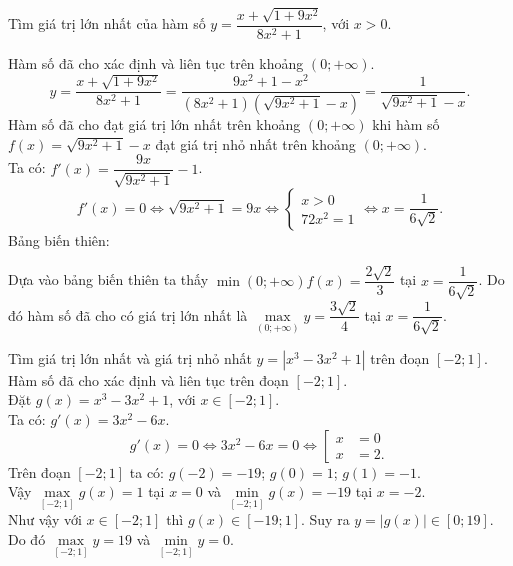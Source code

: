 \begin{bt}%
	Tìm giá trị lớn nhất của hàm số $y = \dfrac{x + \sqrt{1 + 9x^2}}{8x^2 + 1}$, với $x > 0$.
	\loigiai
	{
		Hàm số đã cho xác định và liên tục trên khoảng $(0; +\infty)$.
		$$y = \dfrac{x + \sqrt{1 + 9x^2}}{8x^2 + 1} = \dfrac{9x^2 + 1 - x^2}{(8x^2 + 1)\left( \sqrt{9x^2 + 1} - x \right)} = \dfrac{1}{\sqrt{9x^2 + 1} - x}.$$
		Hàm số đã cho đạt giá trị lớn nhất trên khoảng $(0;+\infty)$ khi hàm số $f(x) = \sqrt{9x^2 + 1} - x$ đạt giá trị nhỏ nhất trên khoảng $(0; +\infty)$.\\
		Ta có: $f'(x) = \dfrac{9x}{\sqrt{9x^2 + 1}} - 1$.
		$$f'(x) = 0 \Leftrightarrow \sqrt{9x^2 + 1} = 9x \Leftrightarrow \begin{cases} x > 0 \\ 72x^2 = 1  \end{cases} \Leftrightarrow x = \dfrac{1}{6\sqrt{2}}.$$
		Bảng biến thiên:
		\begin{center}
		\end{center}
		Dựa vào bảng biến thiên ta thấy $\min\limits{(0;+\infty)} f(x) = \dfrac{2\sqrt{2}}{3}$ tại $x = \dfrac{1}{6\sqrt{2}}$. Do đó hàm số đã cho có giá trị lớn nhất là $\max\limits_{(0;+\infty)} y = \dfrac{3\sqrt{2}}{4}$ tại $x = \dfrac{1}{6\sqrt{2}}$.
	}
\end{bt}


\begin{bt}%
	Tìm giá trị lớn nhất và giá trị nhỏ nhất $y = \left| x^3 - 3x^2 + 1 \right|$ trên đoạn $[-2;1]$.
	\loigiai
	{
		Hàm số đã cho xác định và liên tục trên đoạn $[-2;1]$.\\
		Đặt $g(x) = x^3 - 3x^2 + 1$, với $x \in [-2;1]$.\\
		Ta có: $g'(x) = 3x^2 - 6x$.
		$$g'(x) = 0 \Leftrightarrow 3x^2 - 6x = 0 \Leftrightarrow \left[ \begin{array}{ll} x & = 0 \\ x & = 2.\end{array}   \right.$$
		Trên đoạn $[-2;1]$ ta có: $g(-2) = -19$; $g(0) = 1$; $g(1) = -1$.\\
		Vậy $\max\limits_{[-2;1]} g(x) = 1$ tại $x = 0$ và $\min\limits_{[-2;1]} g(x) = -19$ tại $x = -2$.\\
		Như vậy với $x \in [-2;1]$ thì $g(x) \in [-19;1]$. Suy ra $y = \left| g(x) \right| \in [0;19]$.\\
		Do đó $\max\limits_{[-2;1]} y = 19$ và $\min\limits_{[-2;1]} y = 0$.
	}
\end{bt}


